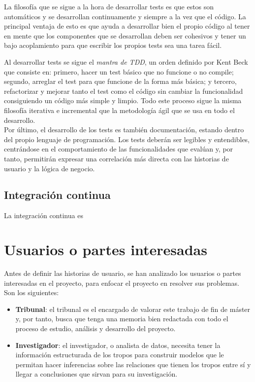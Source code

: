 La filosofía que se sigue a la hora de desarrollar tests es que estos son automáticos y se desarrollan continuamente y siempre a la vez que el código. La principal ventaja de esto es que ayuda a desarrollar bien el propio código al tener en mente que los componentes que se desarrollan deben ser cohesivos y tener un bajo acoplamiento para que escribir los propios tests sea una tarea fácil.

Al desarrollar tests se sigue el \textit{mantra de TDD}, un orden definido por Kent Beck \cite{beck2002driven} que consiste en: primero, hacer un test básico que no funcione o no compile; segundo, arreglar el test para que funcione de la forma más básica; y tercero, refactorizar y mejorar tanto el test como el código sin cambiar la funcionalidad consiguiendo un código más simple y limpio. Todo este proceso sigue la misma filosofía iterativa e incremental que la metodología ágil que se usa en todo el desarrollo.\\

Por último, el desarrollo de los tests es también documentación, estando dentro del propio lenguaje de programación. Los tests deberán ser legibles y entendibles, centrándose en el comportamiento de las funcionalidades que evalúan y, por tanto, permitirán expresar una correlación más directa con las historias de usuario y la lógica de negocio.

\subsection{Integración continua}
La integración continua es 

\section{Usuarios o partes interesadas}
Antes de definir las historias de usuario, se han analizado los usuarios o partes interesadas en el proyecto, para enfocar el proyecto en resolver sus problemas. Son los siguientes:
\begin{itemize}
    \item \textbf{Tribunal}: el tribunal es el encargado de valorar este trabajo de fin de máster y, por tanto, busca que tenga una memoria bien redactada con todo el proceso de estudio, análisis y desarrollo del proyecto.
    \item \textbf{Investigador}: el investigador, o analista de datos, necesita tener la información estructurada de los tropos para construir modelos que le permitan hacer inferencias sobre las relaciones que tienen los tropos entre sí y llegar a conclusiones que sirvan para su investigación.
\end{itemize}

